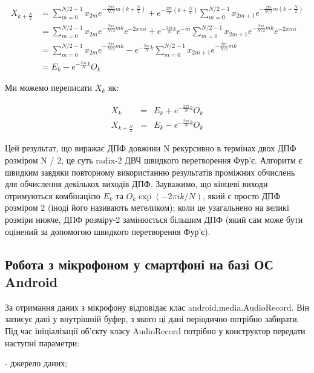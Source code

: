 \begin{align}
X_{k + \frac{N}{2}} & =  \sum \limits_{m=0}^{N/2-1} x_{2m}   e^{-\frac{2\pi i}{N/2} m(k + \frac{N}{2})} +  e^{-\frac{2\pi i}{N}(k + \frac{N}{2})}
 \sum \limits_{m=0}^{N/2-1} x_{2m+1} e^{-\frac{2\pi i}{N/2} m(k + \frac{N}{2} )} \\
 & =  \sum \limits_{m=0}^{N/2-1} x_{2m}   e^{-\frac{2\pi i}{N/2} mk} e^{-2\pi m i} +  e^{-\frac{2\pi i}{N}k}e^{-\pi i}
 \sum \limits_{m=0}^{N/2-1} x_{2m+1} e^{-\frac{2\pi i}{N/2} mk} e^{-2\pi m i} \\
 & =  \sum \limits_{m=0}^{N/2-1} x_{2m}   e^{-\frac{2\pi i}{N/2} mk} - e^{-\frac{2\pi i}{N}k}
 \sum \limits_{m=0}^{N/2-1} x_{2m+1} e^{-\frac{2\pi i}{N/2} mk} \\
& =  E_k - e^{-\frac{2\pi i}{N}k} O_k
\end{align}

Ми можемо переписати $X_k$  як:

\begin{equation}
\begin{matrix}
X_k & =
& E_k + e^{-\frac{2\pi i}{N}k} O_k \\
X_{k+\frac{N}{2}} & =
& E_k - e^{-\frac{2\pi i}{N}{k}} O_k
\end{matrix}
\end{equation}




Цей результат, що виражає ДПФ довжини N рекурсивно в термінах двох ДПФ розміром N / 2, це суть radix-2 ДВЧ швидкого перетворення Фур'є. Алгоритм є швидким завдяки повторному використанню результатів проміжних обчислень для обчислення декількох виходів ДПФ. Зауважимо, що кінцеві виходи отримуються комбінацією $E_k$ та $O_k \exp(-2\pi i k/N)$, який є просто ДПФ розміром 2 (іноді його називають метеликом); коли це узагальнено на великі розміри нижче, ДПФ розміру-2 замінюється більшим ДПФ (який сам може бути оцінений за допомогою швидкого перетворення Фур'є).

\subsection{Робота з мікрофоном у смартфоні на базі ОС Android}

За отримання даних з мікрофону відповідає клас android.media.AudioRecord. Він записує дані у внутрішній буфер, з якого ці дані періодично потрібно забирати. Під час ініціалізації об'єкту класу AudioRecord потрібно у конструктор передати наступні параметри:

- джерело даних;

